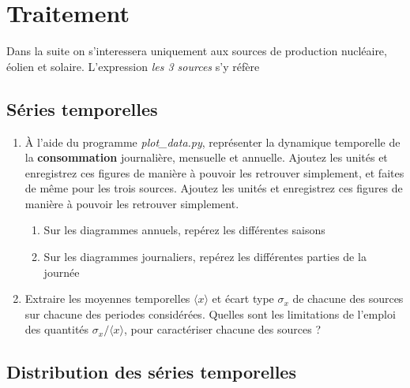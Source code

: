 \documentclass{article}
\newcommand{\tmtextbf}[1]{{\bfseries{#1}}}
\newcommand{\tmtextit}[1]{{\itshape{#1}}}
\begin{document}
\section{Traitement}

Dans la suite on s'interessera uniquement aux sources de production
nucléaire, éolien et solaire. L'expression \tmtextit{les 3 sources} s'y
réfère

\subsection{Séries temporelles}

\begin{enumerate}
  \item À l'aide du programme \tmtextit{plot\_data.py}, représenter la
  dynamique temporelle de la \tmtextbf{consommation} journalière, mensuelle
  et annuelle. Ajoutez les unités et enregistrez ces figures de manière à
  pouvoir les retrouver simplement, et faites de même pour les trois sources.
  Ajoutez les unités et enregistrez ces figures de manière à pouvoir les
  retrouver simplement.
  \begin{enumerate}
    \item Sur les diagrammes annuels, repérez les différentes saisons
    
    \item Sur les diagrammes journaliers, repérez les différentes parties de
    la journée
  \end{enumerate}
  \item Extraire les moyennes temporelles $\langle x \rangle$ et écart type
  $\sigma_x$ de chacune des sources sur chacune des periodes considérées.
  Quelles sont les limitations de l'emploi des quantités $\sigma_x / \langle
  x \rangle$, pour caractériser chacune des sources ?
\end{enumerate}

\subsection{Distribution des séries temporelles}
\end{document}
